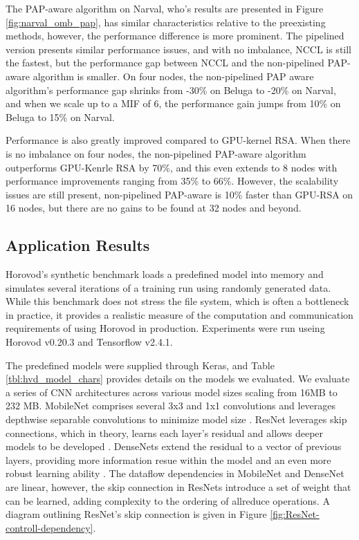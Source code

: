 The \gls{PAP}-aware algorithm on Narval, who's results are presented in Figure \ref{fig:narval_omb_pap}, has similar characteristics relative to the preexisting methods, however, the performance difference is more prominent.
The pipelined version presents similar performance issues, and with no imbalance, \gls{NCCL} is still the fastest, but the performance gap between \gls{NCCL} and the non-pipelined \gls{PAP}-aware algorithm is smaller.
On four nodes, the non-pipelined \gls{PAP} aware algorithm's performance gap shrinks from -30\% on Beluga to -20\% on Narval, and when we scale up to a \gls{MIF} of 6, the performance gain jumps from 10\% on Beluga to 15\% on Narval.

Performance is also greatly improved compared to GPU-kernel RSA.
When there is no imbalance on four nodes, the non-pipelined \gls{PAP}-aware algorithm outperforms \gls{GPU}-Kenrle \gls{RSA} by 70\%, and this even extends to 8 nodes with performance improvements ranging from 35\% to 66\%.
However, the scalability issues are still present, non-pipelined \gls{PAP}-aware is 10\% faster than \gls{GPU}-\gls{RSA} on 16 nodes, but there are no gains to be found at 32 nodes and beyond.

\subsection{Application Results}\label{sec:CH5-eval-horovod}
Horovod's synthetic benchmark loads a predefined model into memory and simulates several iterations of a training run using randomly generated data.
While this benchmark does not stress the file system, which is often a bottleneck in practice, it provides a realistic measure of the computation and communication requirements of using Horovod in production.
Experiments were run useing Horovod v0.20.3 and Tensorflow v2.4.1.



The predefined models were supplied through Keras, and Table \ref{tbl:hvd_model_chars} provides details on the models we evaluated.
We evaluate a series of \gls{CNN} architectures across various model sizes scaling from 16MB to 232 MB.
MobileNet comprises several 3x3 and 1x1 convolutions and leverages depthwise separable convolutions to minimize model size \cite{Howard2017MobileNet}.
ResNet leverages skip connections, which in theory, learns each layer's residual and allows deeper models to be developed \cite{He2015ResNet}.
DenseNets extend the residual to a vector of previous layers, providing more information resue within the model and an even more robust learning ability \cite{Huang2016DenseNet}.
The dataflow dependencies in MobileNet and DenseNet are linear, however, the skip connection in ResNets introduce a set of weight that can be learned, adding complexity to the ordering of allreduce operations.
A diagram outlining ResNet's skip connection is given in Figure \ref{fig:ResNet-controll-dependency}.

